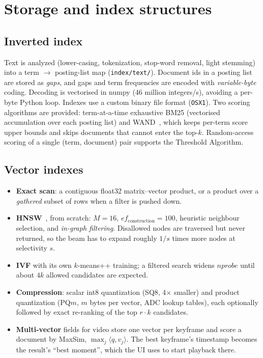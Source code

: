 \documentclass[11pt,a4paper]{article}
\newcommand{\code}[1]{\texttt{\small #1}}
\begin{document}
\section{Storage and index structures}
\label{sec:storage}

\subsection{Inverted index}
Text is analyzed (lower-casing, tokenization, stop-word removal, light stemming) into a term $\rightarrow$
posting-list map (\code{index/text/}). Document ids in a posting list are stored as \emph{gaps}, and
gaps and term frequencies are encoded with \emph{variable-byte} coding. Decoding is vectorised in numpy
(46 million integers/s), avoiding a per-byte Python loop. Indexes use a custom binary file format
(\code{OSX1}). Two scoring algorithms are provided: term-at-a-time exhaustive BM25 (vectorised
accumulation over each posting list) and WAND~\cite{wand}, which keeps per-term score upper bounds and
skips documents that cannot enter the top-$k$. Random-access scoring of a single (term, document) pair
supports the Threshold Algorithm.

\subsection{Vector indexes}
\begin{itemize}
  \item \textbf{Exact scan}: a contiguous float32 matrix--vector product, or a product over a
        \emph{gathered} subset of rows when a filter is pushed down.
  \item \textbf{HNSW}~\cite{hnsw}, from scratch: $M = 16$, $ef_{\text{construction}} = 100$, heuristic
        neighbour selection, and \emph{in-graph filtering}. Disallowed nodes are traversed but never
        returned, so the beam has to expand roughly $1/s$ times more nodes at selectivity $s$.
  \item \textbf{IVF} with its own $k$-means++ training; a filtered search widens $nprobe$ until about
        $4k$ allowed candidates are expected.
  \item \textbf{Compression}: scalar int8 quantization (SQ8, 4$\times$ smaller) and product
        quantization (PQ$m$, $m$ bytes per vector, ADC lookup tables), each optionally followed by exact
        re-ranking of the top $r \cdot k$ candidates.
  \item \textbf{Multi-vector} fields for video store one vector per keyframe and score a document by
        MaxSim, $\max_j \langle q, v_j\rangle$. The best keyframe's timestamp becomes the result's
        ``best moment'', which the UI uses to start playback there.
\end{itemize}
\end{document}
